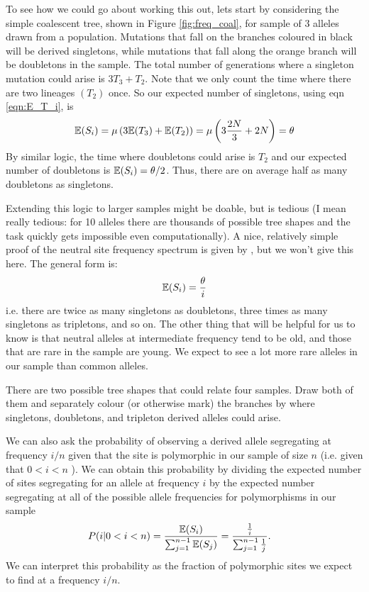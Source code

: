 To see how we could go about working this out, lets start by considering the simple coalescent tree, shown in Figure \ref{fig:freq_coal}, for sample of $3$ alleles drawn from a population. Mutations that fall on the
branches coloured in black will be derived singletons, while mutations that
fall along the orange branch will be doubletons in the sample. The
total number of generations where a singleton mutation could arise is
$3 T_3 + T_2$. Note that we only count the time where there are two
lineages $(T_{2})$ once. So our expected number of singletons, using eqn \eqref{eqn:E_T_i}, is
\begin{equation}
\mathbb{E}(S_i) = \mu \left( 3\mathbb{E}(T_3) +  \mathbb{E}(T_2) \right) = \mu \left( 3
  \frac{2N}{3}+ 2N \right) = \theta
\end{equation}
By similar logic, the time where doubletons could arise is
$T_2$ and our expected number of doubletons is $\mathbb{E}(S_i)
=\theta/2$. Thus, there are on average half as many doubletons as singletons.

Extending this logic to larger samples might be doable, but is tedious (I mean really tedious: for 10 alleles there are thousands of possible tree shapes and the task quickly gets impossible even computationally). A nice, relatively simple proof of the neutral site frequency spectrum is given by
\citep{Hudson:15}, but we won't give this here. The general form is:
\begin{equation}
\mathbb{E}(S_i) = \frac{\theta }{i}   \label{eqn:neutral_freq_spec}
\end{equation}
i.e. there are twice as many singletons as doubletons, three times as many
singletons as tripletons, and so on. The other thing that will be
helpful for us to know is that neutral alleles at intermediate frequency tend to be old, and those that are rare in the sample are young. We expect to see a lot more rare alleles in our sample than common alleles.

\begin{question}
There are two possible tree shapes that could relate four
samples. Draw both of them and separately colour (or otherwise mark) the branches by where singletons, doubletons, and tripleton derived alleles could arise.
\end{question}

We can also ask the probability of observing a derived allele segregating at frequency $i/n$ given that the site is polymorphic in our sample of size $n$ (i.e. given that $0<i<n$ ). We can obtain this probability by dividing the expected number of sites segregating for an allele at frequency $i$ by the expected number segregating at all of the possible allele frequencies for polymorphisms in our sample
\begin{eqnarray}
P(i |0<i<n) &=\frac{\mathbb{E}(S_i)}{\sum_{j=1}^{n-1} \mathbb{E}(S_j)} = \frac{\frac{1}{i}}{\sum_{j=1}^{n-1} \frac{1}{j}}.
\end{eqnarray}
We can interpret this probability as the fraction of polymorphic sites we expect to find at a frequency $i/n$.

